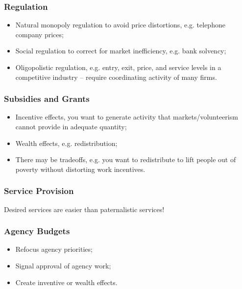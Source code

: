 \documentclass[aspectratio=169]{beamer}
\theoremstyle{principle}
\begin{document}
\begin{frame}
\frametitle{Regulation}
\begin{itemize}
\item Natural monopoly regulation to avoid price distortions, e.g. telephone company prices;
\bigskip
\bigskip
\bigskip
\item Social regulation to correct for market inefficiency, e.g. bank solvency;
\bigskip
\bigskip
\bigskip
\item Oligopolistic regulation, e.g. entry, exit, price, and service levels in a competitive industry -- require coordinating activity of many firms.
\end{itemize}

\end{frame}

\begin{frame}
\frametitle{Subsidies and Grants}
\begin{itemize}
\item Incentive effects, you want to generate activity that markets/volunteerism cannot provide in adequate quantity;
\bigskip
\bigskip
\bigskip
\item Wealth effects, e.g. redistribution;
\bigskip
\bigskip
\bigskip
\item There may be tradeoffs, e.g. you want to redistribute to lift people out of poverty without distorting work incentives.
\end{itemize}

\end{frame}

\begin{frame}
\frametitle{Service Provision}
\begin{center}
\Large Desired services are easier than paternalistic services!
\end{center}
\end{frame}

\begin{frame}
\frametitle{Agency Budgets}
\begin{itemize}
\item Refocus agency priorities;
\bigskip
\bigskip
\bigskip
\item Signal approval of agency work;
\bigskip
\bigskip
\bigskip
\item Create inventive or wealth effects.
\end{itemize}

\end{frame}
\end{document}
